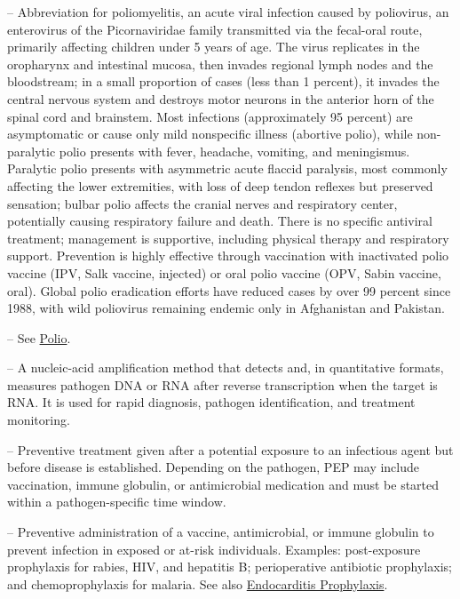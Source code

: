 -- Abbreviation for poliomyelitis, an acute viral infection caused by poliovirus, an enterovirus of the Picornaviridae family transmitted via the fecal-oral route, primarily affecting children under 5 years of age. The virus replicates in the oropharynx and intestinal mucosa, then invades regional lymph nodes and the bloodstream; in a small proportion of cases (less than 1 percent), it invades the central nervous system and destroys motor neurons in the anterior horn of the spinal cord and brainstem. Most infections (approximately 95 percent) are asymptomatic or cause only mild nonspecific illness (abortive polio), while non-paralytic polio presents with fever, headache, vomiting, and meningismus. Paralytic polio presents with asymmetric acute flaccid paralysis, most commonly affecting the lower extremities, with loss of deep tendon reflexes but preserved sensation; bulbar polio affects the cranial nerves and respiratory center, potentially causing respiratory failure and death. There is no specific antiviral treatment; management is supportive, including physical therapy and respiratory support. Prevention is highly effective through vaccination with inactivated polio vaccine (IPV, Salk vaccine, injected) or oral polio vaccine (OPV, Sabin vaccine, oral). Global polio eradication efforts have reduced cases by over 99 percent since 1988, with wild poliovirus remaining endemic only in Afghanistan and Pakistan.

-- See \hyperlink{Polio}{Polio}.

-- A nucleic-acid amplification method that detects and, in quantitative formats, measures pathogen DNA or RNA after reverse transcription when the target is RNA. It is used for rapid diagnosis, pathogen identification, and treatment monitoring.

-- Preventive treatment given after a potential exposure to an infectious agent but before disease is established. Depending on the pathogen, PEP may include vaccination, immune globulin, or antimicrobial medication and must be started within a pathogen-specific time window.

-- Preventive administration of a vaccine, antimicrobial, or immune globulin to prevent infection in exposed or at-risk individuals. Examples: post-exposure prophylaxis for rabies, HIV, and hepatitis B; perioperative antibiotic prophylaxis; and chemoprophylaxis for malaria. See also \hyperlink{Endocarditis Prophylaxis}{Endocarditis Prophylaxis}.

